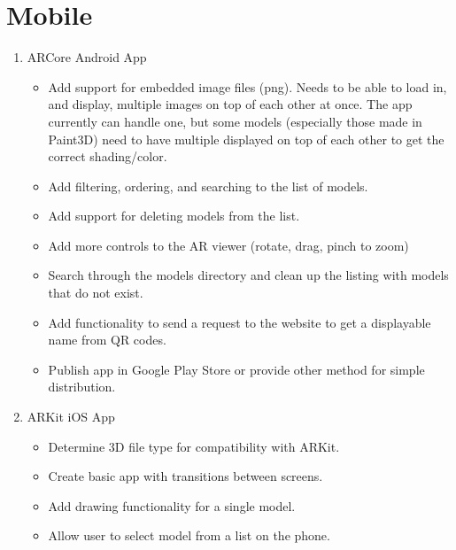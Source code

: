     \section{Mobile}
        \begin{enumerate}
            \item ARCore Android App
            \begin{itemize}
                \item Add support for embedded image files (png).  Needs to be able to load in, and display, multiple images on top of each other at once.  The app currently can handle one, but some models (especially those made in Paint3D) need to have multiple displayed on top of each other to get the correct shading/color.

                \item Add filtering, ordering, and searching to the list of models.

                \item Add support for deleting models from the list.

                \item Add more controls to the AR viewer (rotate, drag, pinch to zoom)

                \item Search through the models directory and clean up the listing with models that do not exist.

                \item Add functionality to send a request to the website to get a displayable name from QR codes.

                \item Publish app in Google Play Store or provide other method for simple distribution.

            \end{itemize}
            \item ARKit iOS App
            \begin{itemize}
                \item Determine 3D file type for compatibility with ARKit.

                \item Create basic app with transitions between screens.

                \item Add drawing functionality for a single model.

                \item Allow user to select model from a list on the phone.


\end{itemize}
\end{enumerate}
